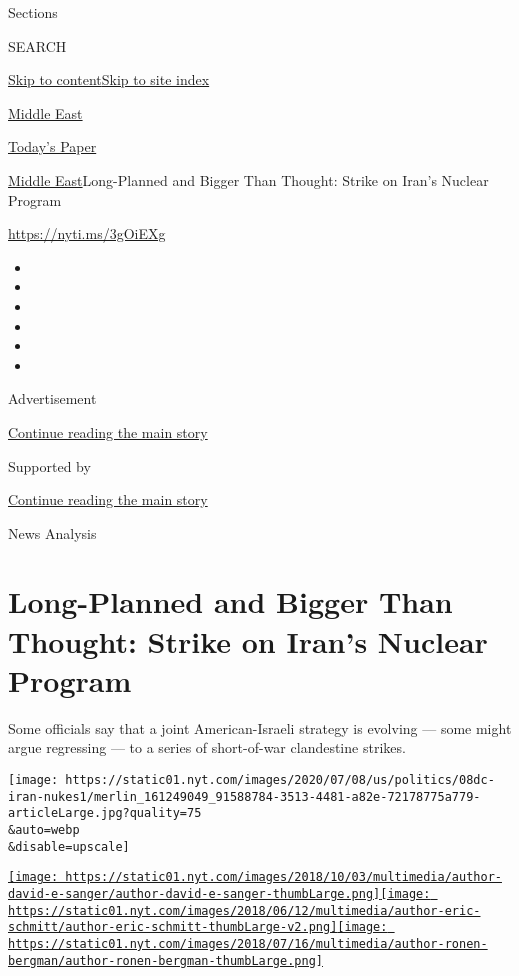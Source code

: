 Sections

SEARCH

\protect\hyperlink{site-content}{Skip to
content}\protect\hyperlink{site-index}{Skip to site index}

\href{https://www.nytimes.com/section/world/middleeast}{Middle East}

\href{https://myaccount.nytimes.com/auth/login?response_type=cookie\&client_id=vi}{}

\href{https://www.nytimes.com/section/todayspaper}{Today's Paper}

\href{/section/world/middleeast}{Middle East}\textbar{}Long-Planned and
Bigger Than Thought: Strike on Iran's Nuclear Program

\url{https://nyti.ms/3gOiEXg}

\begin{itemize}
\item
\item
\item
\item
\item
\item
\end{itemize}

Advertisement

\protect\hyperlink{after-top}{Continue reading the main story}

Supported by

\protect\hyperlink{after-sponsor}{Continue reading the main story}

News Analysis

\hypertarget{long-planned-and-bigger-than-thought-strike-on-irans-nuclear-program}{%
\section{Long-Planned and Bigger Than Thought: Strike on Iran's Nuclear
Program}\label{long-planned-and-bigger-than-thought-strike-on-irans-nuclear-program}}

Some officials say that a joint American-Israeli strategy is evolving
--- some might argue regressing --- to a series of short-of-war
clandestine strikes.

\texttt{[image: https://static01.nyt.com/images/2020/07/08/us/politics/08dc-iran-nukes1/merlin\_161249049\_91588784-3513-4481-a82e-72178775a779-articleLarge.jpg?quality=75\\\&auto=webp\\\&disable=upscale]}

\href{https://www.nytimes.com/by/david-e-sanger}{\texttt{[image: https://static01.nyt.com/images/2018/10/03/multimedia/author-david-e-sanger/author-david-e-sanger-thumbLarge.png]}}\href{https://www.nytimes.com/by/eric-schmitt}{\texttt{[image: https://static01.nyt.com/images/2018/06/12/multimedia/author-eric-schmitt/author-eric-schmitt-thumbLarge-v2.png]}}\href{https://www.nytimes.com/by/ronen-bergman}{\texttt{[image: https://static01.nyt.com/images/2018/07/16/multimedia/author-ronen-bergman/author-ronen-bergman-thumbLarge.png]}}

